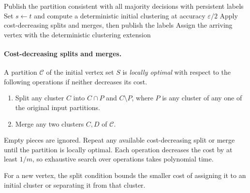 \documentclass[11pt]{article}
\begin{document}
\begin{algorithm}[htbp]
\caption{Deterministic online consensus clustering}
\label{alg:det-online}
\begin{algorithmic}[1]
        \State Publish the partition consistent with all majority decisions with persistent labels
    \Else
            \State Set $s\gets t$ and compute a deterministic initial clustering at accuracy $\varepsilon/2$
            \State Apply cost-decreasing splits and merges, then publish the labels
        \Else
            \State Assign the arriving vertex with the deterministic clustering extension
        \EndIf
    \EndIf
\EndFor
\end{algorithmic}
\end{algorithm}

\paragraph{Cost-decreasing splits and merges.}

A partition $\mathcal C$ of the initial vertex set $S$ is \emph{locally optimal}
with respect to the following operations if neither decreases its cost.
\begin{enumerate}
\item Split any cluster $C$ into $C\cap P$ and $C\setminus P$, where
$P$ is any cluster of any one of the original input partitions.
\item Merge any two clusters $C,D$ of $\mathcal C$.
\end{enumerate}
Empty pieces are ignored. Repeat any available cost-decreasing split or merge until the
partition is locally optimal. Each operation decreases the cost by at least
$1/m$, so exhaustive search over operations takes polynomial time.

For a new vertex, the split condition bounds the smaller cost of
assigning it to an initial cluster or separating it from that cluster.
\end{document}
